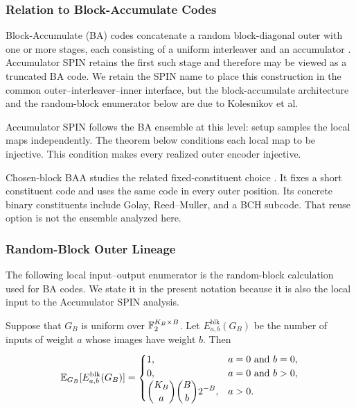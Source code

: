 \subsubsection{Relation to Block-Accumulate Codes}

Block-Accumulate (BA) codes concatenate a random block-diagonal outer with
one or more stages, each consisting of a uniform interleaver and an accumulator
\cite{KolesnikovEtAl2026BA}. Accumulator SPIN retains the first such stage and
therefore may be viewed as a truncated BA code. We retain the SPIN name to
place this construction in the common outer--interleaver--inner interface, but
the block-accumulate architecture and the random-block enumerator below are
due to Kolesnikov et al.

Accumulator SPIN follows the BA ensemble at this level: setup samples the
local maps independently. The theorem below conditions each local map to be
injective. This condition makes every realized outer encoder injective.

Chosen-block BAA studies the related fixed-constituent choice
\cite{cryptoeprint:2026/1903}. It fixes a short constituent code and
uses the same code in every outer position. Its concrete binary constituents
include Golay, Reed--Muller, and a BCH subcode. That reuse option is not the
ensemble analyzed here.

\subsubsection{Random-Block Outer Lineage}

The following local input--output enumerator is the random-block calculation
used for BA codes. We state it in the present notation because it is also the
local input to the Accumulator SPIN analysis.

\begin{lemma}
\label{lem:uniform-random-block-enumerator}
Suppose that $G_B$ is uniform over $\mathbb F_2^{K_B\times B}$. Let
$E^{\mathrm{blk}}_{a,b}(G_B)$ be the number of inputs of weight $a$ whose
images have weight $b$. Then
\begin{equation}
  \mathbb E_{G_B}[E^{\mathrm{blk}}_{a,b}(G_B)]
  =
  \begin{cases}
    1, & a=0 \text{ and } b=0,\\
    0, & a=0 \text{ and } b>0,\\
    \displaystyle
    \binom{K_B}{a}\binom{B}{b}2^{-B}, & a>0.
  \end{cases}
  \label{eq:uniform-random-block-enumerator}
\end{equation}
\end{lemma}

